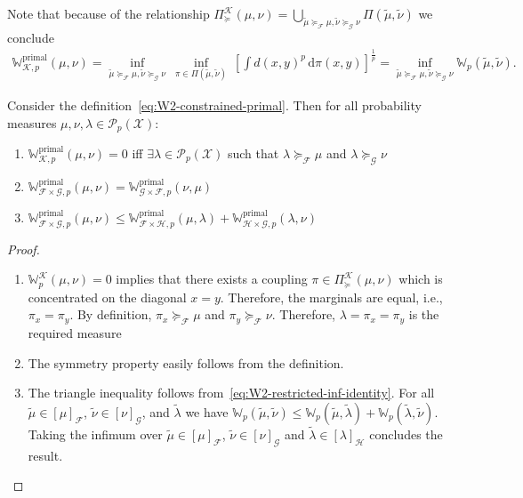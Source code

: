 \documentclass[10pt]{article}
\newcommand{\ud}{\,\mathrm{d}}
\newcommand{\op}[1]{\operatorname{#1}}
\renewcommand{\tilde}{\widetilde}
\newcommand{\prim}{\op{primal}}
\newcommand{\W}{\mathds{W}}
\newcommand{\calF}{\mathcal{F}}
\newcommand{\calG}{\mathcal{G}}
\newcommand{\calK}{\mathcal{K}}
\newcommand{\calP}{\mathcal{P}}
\newcommand{\calX}{\mathcal{X}}
\numberwithin{equation}{section}
\begin{document}
Note that because of the relationship $\Pi_{\succeq}^\calK(\mu,\nu)=\bigcup_{\tilde{\mu}\succeq_\calF\mu,\tilde{\nu}\succeq_\calG \nu} \Pi(\tilde{\mu},\tilde{\nu})$ we conclude
\begin{equation}\label{eq:W2-restricted-inf-identity}
\begin{aligned}
\W_{\calK,p}^{\prim}(\mu,\nu) 
= \inf_{\tilde{\mu}\succeq_\calF\mu,\tilde{\nu}\succeq_\calG \nu} ~\inf_{\pi \in \Pi(\tilde{\mu},\tilde{\nu})}~\left[\int d(x,y)^p\ud \pi(x,y)\right]^{\frac{1}{p}}
=\inf_{\tilde{\mu}\succeq_\calF\mu,\tilde{\nu}\succeq_\calG \nu} \W_p(\tilde{\mu},\tilde{\nu}).
\end{aligned}
\end{equation}

\begin{proposition}\label{prop:metric} 
Consider the definition~\eqref{eq:W2-constrained-primal}. Then for all probability measures $\mu,\nu,\lambda\in \calP_p(\calX)$:
	\begin{enumerate}
		\item $\W_{\calK,p}^{\prim}(\mu,\nu) = 0$ iff $\exists \lambda \in \calP_p(\calX)$ such that $\lambda \succeq_\calF \mu$ and $\lambda \succeq_\calG \nu$ 
		\item $\W^{\prim}_{\calF \times \calG,p}(\mu,\nu)=\W^{\prim}_{\calG \times \calF,p}(\nu,\mu)$
		\item $\W^{\prim}_{\calF \times \calG,p}(\mu,\nu) \leq \W^{\prim}_{\calF \times \mathcal{H},p}(\mu,\lambda) + \W^{\prim}_{\mathcal{H} \times \calG,p}(\lambda,\nu)$
	\end{enumerate}
\end{proposition}
\begin{proof}
	\begin{enumerate}
		\item $\W^\calK_{p}(\mu,\nu) = 0$ implies that there exists a coupling $\pi \in \Pi_{\succeq}^\calK(\mu,\nu)$ which is concentrated on the diagonal $x=y$. Therefore, the marginals are equal, i.e., $\pi_x=\pi_y$. By definition, $\pi_x \succeq_\calF \mu$ and $\pi_y \succeq_\calF \nu$. Therefore, $\lambda=\pi_x=\pi_y$ is the required measure
		\item The symmetry property easily follows from the definition.
		\item The triangle inequality follows from~\eqref{eq:W2-restricted-inf-identity}. For all $\tilde{\mu} \in [\mu]_\calF$, $\tilde{\nu}\in [\nu]_\calG$, and $\tilde{\lambda}$ we have $\W_{p}(\tilde{\mu},\tilde{\nu}) \leq \W_{p}(\tilde{\mu},\tilde{\lambda}) + \W_{p}(\tilde{\lambda},\tilde{\nu})$. Taking the infimum over $\tilde{\mu}\in[\mu]_\calF$, $\tilde{\nu}\in [\nu]_\calG$ and $\tilde{\lambda} \in [\lambda]_\mathcal{H}$ concludes the result.
		 
	\end{enumerate}
\end{proof}
\end{document}
